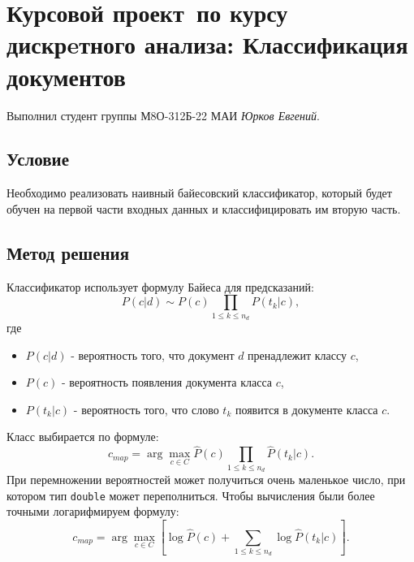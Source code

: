 \documentclass[12pt]{article}
\begin{document}
\section*{Курсовой проект\, по курсу дискрeтного анализа: Классификация документов}

Выполнил студент группы М8О-312Б-22 МАИ \textit{Юрков Евгений}.

\subsection*{Условие}

Необходимо реализовать наивный байесовский классификатор, который будет обучен на первой части входных данных и классифицировать им вторую часть.

\subsection*{Метод решения}

Классификатор использует формулу Байеса для предсказаний:
$$P(c|d) \sim P(c) \prod_{1 \leq k \leq n_d} P(t_k | c),$$
где
\begin{itemize}
    \item $P(c|d)$ - вероятность того, что документ $d$ пренадлежит классу $c$,
    \item $P(c)$ - вероятность появления документа класса $c$,
    \item $P(t_k | c)$ - вероятность того, что слово $t_k$ появится в документе класса $c$.
\end{itemize}

Класс выбирается по формуле:
$$c_{map} = \arg \max_{c \in C} \widehat{P}(c) \prod_{1 \leq k \leq n_d}
\widehat{P}(t_k | c).$$ При перемножении вероятностей может получиться очень
маленькое число, при котором тип \texttt{double} может переполниться.
Чтобы вычисления были более точными логарифмируем формулу:
$$c_{map} = \arg \max_{c \in C} [ \log \widehat{P}(c) + \sum_{1 \leq k \leq n_d}
\log \widehat{P}(t_k | c) ].$$
\end{document}
